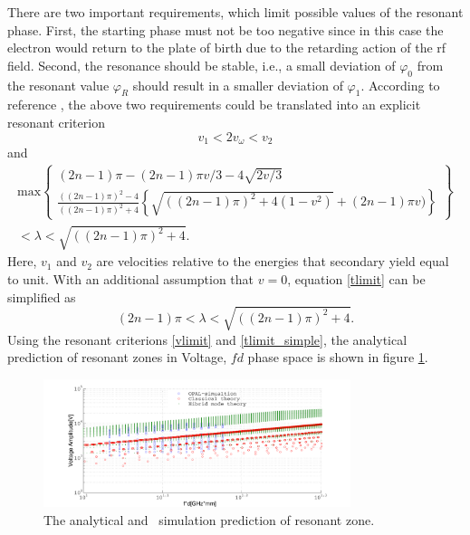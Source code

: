 \documentclass[a4paper,11pt]{article}
\begin{document}
There are two important requirements, which limit possible values of the resonant phase. First, the starting phase must not be too negative since in this case the electron would return to the plate of birth due to the retarding action of the rf field. Second, the resonance should be stable, i.e., a small deviation of $\varphi_0$ from the resonant value $\varphi_R$ should result in a smaller deviation of $\varphi_1$. According to reference \cite{PN}, the above two requirements could be translated into an explicit resonant criterion
\begin{equation}
v_1<2v_{\omega}<v_2 \label{vlimit}
\end{equation}
and
\begin{eqnarray}
\text{max}\left \{
\begin{array}{cc}
(2n-1)\pi-(2n-1)\pi v/3-4\sqrt{2v/3}\\[1em]
\displaystyle \frac{((2n-1)\pi)^2-4}{((2n-1)\pi)^2+4}\left \{\sqrt{((2n-1)\pi)^2+4(1-v^2)}+(2n-1)\pi v )\right \}
\end{array}
\right \}\nonumber
\\[1em]
<\lambda<\sqrt{((2n-1)\pi)^2+4}.\label{tlimit}
\end{eqnarray}
Here, $v_1$ and $v_2$ are velocities relative to the energies that secondary yield equal to unit. With an additional assumption that $v = 0$, equation \eqref{tlimit} can be simplified as
\begin{equation}
(2n-1)\pi<\lambda<\sqrt{((2n-1)\pi)^2+4}.\label{tlimit_simple}
\end{equation}
Using the resonant criterions \eqref{vlimit} and \eqref{tlimit_simple}, the analytical prediction of resonant zones in Voltage,
$fd$ phase space is shown in figure \ref{fig:bench}.
\begin{figure}[H]
\begin{center}
\includegraphics[width=0.8\textwidth]{benchmark2.pdf}
\end{center}
\caption{ The analytical and \opal\ simulation prediction of resonant zone.\label{fig:bench}}
\end{figure}
\end{document}
